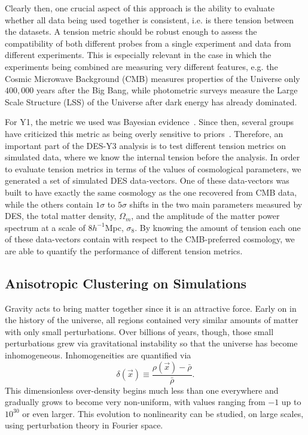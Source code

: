\documentclass[12pt]{article}
\newcommand\be{\begin{equation}}
\def\ee{\end{equation}}
\begin{document}
\begin{small}
Clearly then, one crucial aspect of this approach is the ability to evaluate whether all data being used together is consistent, i.e. is there tension between the datasets. A tension metric should be robust enough to assess the compatibility of both different probes from a single experiment and data from different experiments. This is especially relevant in the case in which the experiments being combined are measuring very different features, e.g. the Cosmic Microwave Background (CMB) measures properties of the Universe only  $400,000$  years after the  Big  Bang, while photometric surveys measure the Large Scale Structure (LSS) of the Universe after dark energy has already dominated.

For Y1, the metric we used was Bayesian evidence~\cite{Marshall:2003ez}. Since then, several groups have criticized this metric as being overly sensitive to priors~\cite{Raveri:2018wln,Handley:2019wlz}. Therefore, an important part of the DES-Y3 analysis is to test different tension metrics on simulated data, where we know the internal tension before the analysis. %
In order to evaluate tension metrics in terms of the values of cosmological parameters, we generated a set of simulated DES data-vectors. One of these data-vectors was built to have exactly the same cosmology as the one recovered from CMB data, while the others contain $1\sigma$ to $5\sigma$ shifts in the two main parameters measured by DES, the total matter density, $\Omega_m$, and the amplitude of the matter power spectrum at a scale of $8h^{-1}$Mpc, $\sigma_8$. By knowing the amount of tension each one of these data-vectors contain with respect to the CMB-preferred cosmology, we are able to quantify the performance of different tension metrics.



\subsection{Anisotropic Clustering on Simulations}
Gravity acts to bring matter together since it is an attractive force. Early on in the history of the universe, all regions contained very similar amounts of matter with only small perturbations. Over billions of years, though, those small perturbations grew via gravitational instability so that the universe has become inhomogeneous. Inhomogeneities are quantified via
\be
\delta(\vec x) \equiv \frac{\rho(\vec x) - \bar\rho}{\bar\rho}.\ee
This dimensionless over-density begins much less than one everywhere and gradually grows to become very non-uniform, with values ranging from $-1$ up to $10^{30}$ or even larger. This evolution to nonlinearity can be studied, on large scales, using perturbation theory in Fourier space.


\end{small}
\end{document}
